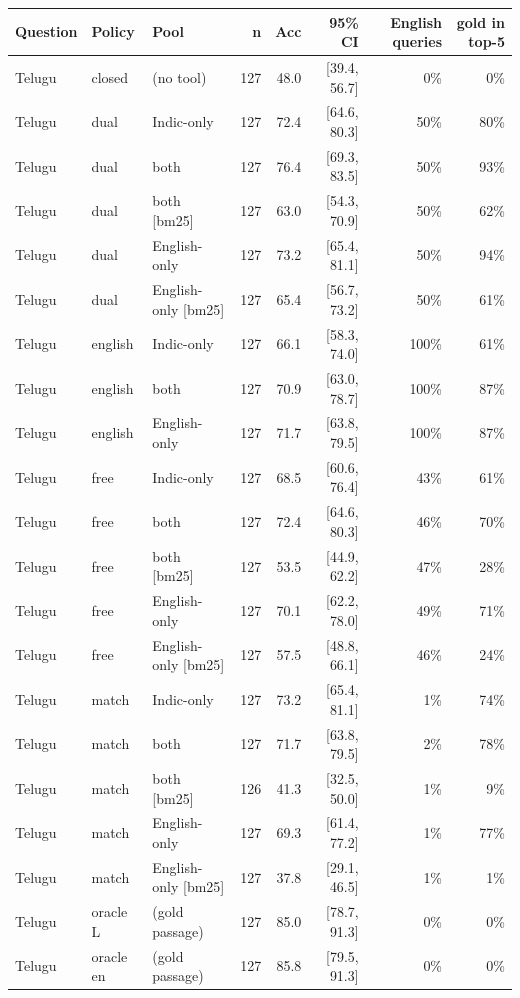 \begin{table}[h]\centering\scriptsize
\begin{tabular}{lllrrrrr}
\toprule
Question & Policy & Pool & n & Acc & 95\% CI & English queries & gold in top-5 \\
\midrule
Telugu & closed & (no tool) & 127 & 48.0 & [39.4, 56.7] & 0\% & 0\% \\
Telugu & dual & Indic-only & 127 & 72.4 & [64.6, 80.3] & 50\% & 80\% \\
Telugu & dual & both & 127 & 76.4 & [69.3, 83.5] & 50\% & 93\% \\
Telugu & dual & both [bm25] & 127 & 63.0 & [54.3, 70.9] & 50\% & 62\% \\
Telugu & dual & English-only & 127 & 73.2 & [65.4, 81.1] & 50\% & 94\% \\
Telugu & dual & English-only [bm25] & 127 & 65.4 & [56.7, 73.2] & 50\% & 61\% \\
Telugu & english & Indic-only & 127 & 66.1 & [58.3, 74.0] & 100\% & 61\% \\
Telugu & english & both & 127 & 70.9 & [63.0, 78.7] & 100\% & 87\% \\
Telugu & english & English-only & 127 & 71.7 & [63.8, 79.5] & 100\% & 87\% \\
Telugu & free & Indic-only & 127 & 68.5 & [60.6, 76.4] & 43\% & 61\% \\
Telugu & free & both & 127 & 72.4 & [64.6, 80.3] & 46\% & 70\% \\
Telugu & free & both [bm25] & 127 & 53.5 & [44.9, 62.2] & 47\% & 28\% \\
Telugu & free & English-only & 127 & 70.1 & [62.2, 78.0] & 49\% & 71\% \\
Telugu & free & English-only [bm25] & 127 & 57.5 & [48.8, 66.1] & 46\% & 24\% \\
Telugu & match & Indic-only & 127 & 73.2 & [65.4, 81.1] & 1\% & 74\% \\
Telugu & match & both & 127 & 71.7 & [63.8, 79.5] & 2\% & 78\% \\
Telugu & match & both [bm25] & 126 & 41.3 & [32.5, 50.0] & 1\% & 9\% \\
Telugu & match & English-only & 127 & 69.3 & [61.4, 77.2] & 1\% & 77\% \\
Telugu & match & English-only [bm25] & 127 & 37.8 & [29.1, 46.5] & 1\% & 1\% \\
Telugu & oracle L & (gold passage) & 127 & 85.0 & [78.7, 91.3] & 0\% & 0\% \\
Telugu & oracle en & (gold passage) & 127 & 85.8 & [79.5, 91.3] & 0\% & 0\% \\

\end{tabular}
\end{table}
